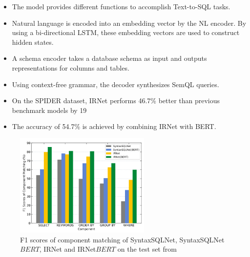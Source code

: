 \begin{itemize}
    \item The model provides different functions to accomplish Text-to-SQL tasks.
    \item Natural language is encoded into an embedding vector by the NL encoder. By using a bi-directional LSTM, these embedding vectors are used to construct hidden states.
    \item A schema encoder takes a database schema as input and outputs representations for columns and tables.
    \item Using context-free grammar, the decoder synthesizes SemQL queries.
    \item On the SPIDER dataset, IRNet performs 46.7\% better than previous benchmark models by 19%
    \item The accuracy of 54.7\% is achieved by combining IRNet with BERT.
\end{itemize}

\begin{figure}[htb]
    \centering
    \includegraphics[width=0.6\textwidth]{pics/IRNet/f1}
    \caption{F1 scores of component matching of SyntaxSQLNet, SyntaxSQLNet\(BERT\), IRNet and IRNet\(BERT\) on the test set from \cite{DBLP:journals/corr/abs-1905-08205}}
    \label{fig:f1}
\end{figure}
